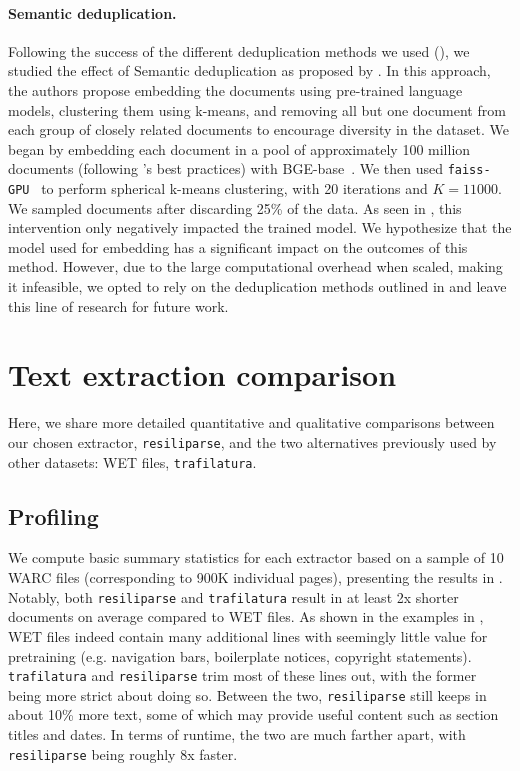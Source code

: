 \documentclass{article}
\newcommand{\trafilatura}{\texttt{trafilatura}\xspace}
\newcommand{\resiliparse}{\texttt{resiliparse}\xspace}
\begin{document}
\paragraph{Semantic deduplication.} Following the success of the different deduplication methods we used (), we studied the effect of Semantic deduplication as proposed by \citet{abbas2023semdedup}.
In this approach, the authors propose embedding the documents using pre-trained language models, clustering them using k-means, and removing all but one document from each group of closely related documents to encourage diversity in the dataset.
We began by embedding each document in a pool of approximately 100 million documents (following \citet{abbas2023semdedup}'s best practices) with BGE-base~\citep{bge_embedding}.
We then used \texttt{faiss-GPU}~\citep{johnson2019billion} to perform spherical k-means clustering, with 20 iterations and $K=11000$.
We sampled documents after discarding 25\% of the data.
As seen in , this intervention only negatively impacted the trained model.
We hypothesize that the model used for embedding has a significant impact on the outcomes of this method.
However, due to the large computational overhead when scaled, making it infeasible, we opted to rely on the deduplication methods outlined in  and leave this line of research for future work.

\section{Text extraction comparison}\label{appx:text-extraction}

Here, we share more detailed quantitative and qualitative comparisons between our chosen extractor, \resiliparse \citep{resiliparse1}, and the two alternatives previously used by other datasets: WET files, \trafilatura \citep{trafilatura}.

\subsection{Profiling}

We compute basic summary statistics for each extractor based on a sample of 10 WARC files (corresponding to 900K individual pages), presenting the results in . Notably, both \resiliparse and \trafilatura result in at least 2x shorter documents on average compared to WET files.  As shown in the examples in , WET files indeed contain many additional lines with seemingly little value for pretraining (e.g. navigation bars, boilerplate notices, copyright statements). \trafilatura and \resiliparse trim most of these lines out, with the former being more strict about doing so. Between the two, \resiliparse still keeps in about 10\% more text, some of which may provide useful content such as section titles and dates. In terms of runtime, the two are much farther apart, with \resiliparse being roughly 8x faster.
\end{document}
